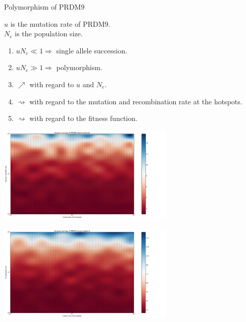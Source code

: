 \documentclass[10pt]{beamer}
\begin{document}
\begin{frame}
	\begin{center}
		\Large
    	Polymorphism of PRDM9
	\end{center}
	$ u $ is the mutation rate of PRDM9. \\
	$ N_e $ is the population size. \\ 
	\begin{enumerate}
		\item $u N_e \ll 1 \Rightarrow  $ single allele succession.
		\item $u N_e \gg 1 \Rightarrow  $ polymorphism.
		
		\item $\nearrow$ with regard to $u$ and $N_e$.
		
		\item $\rightsquigarrow$ with regard to the mutation and recombination rate at the hotspots.
		
		\item $\rightsquigarrow$ with regard to the fitness function.
	\end{enumerate}
\end{frame}

\begin{frame}
	\begin{center}
       \includegraphics[width=8.5cm]{Images/simpson-entropy-mutation-erosion.png}
	\end{center}
\end{frame}


\begin{frame}
	\begin{center}
       \includegraphics[width=8.5cm]{Images/simpson-entropy-population-erosion.png}
	\end{center}
\end{frame}
\end{document}
